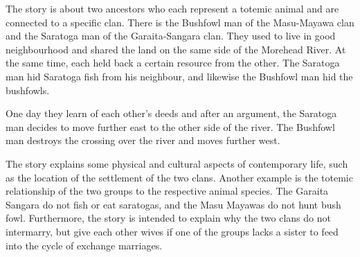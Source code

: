 The story is about two ancestors who each represent a totemic animal and are connected to a specific clan. There is the Bushfowl man of the Masu-Mayawa clan and the Saratoga man of the Garaita-Sangara clan. They used to live in good neighbourhood and shared the land on the same side of the Morehead River. At the same time, each held back a certain resource from the other. The Saratoga man hid Saratoga fish from his neighbour, and likewise the Bushfowl man hid the bushfowls.

One day they learn of each other's deeds and after an argument, the Saratoga man decides to move further east to the other side of the river. The Bushfowl man destroys the crossing over the river and moves further west.

The story explains some physical and cultural aspects of contemporary life, such as the location of the settlement of the two clans. Another example is the totemic relationship of the two groups to the respective animal species. The Garaita Sangara do not fish or eat saratogas, and the Masu Mayawas do not hunt bush fowl. Furthermore, the story is intended to explain why the two clans do not intermarry, but give each other wives if one of the groups lacks a sister to feed into the cycle of exchange marriages.